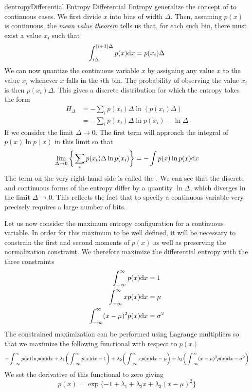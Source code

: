 \documentclass[9pt]{article}
\begin{document}
\begin{topic}{dentropy}{Differential Entropy}
Differential Entropy generalize the concept of  to continuous cases. We first divide $x$ into bins of width $\Delta$. Then, assuming $p(x)$ is continuous, the \textit{mean value theorem} tells us that, for each such bin, there must exist a value $x_i$ such that
\[
\int_{i\Delta}^{(i+1)\Delta} p(x)\mathrm{d} x = p(x_i)\Delta
\]
We can now quantize the continuous variable $x$ by assigning any value $x$ to the value $x_i$ whenever $x$ falls in the $i$th bin. The probability of observing the value $x_i$ is then $p(x_i)\Delta$. This gives a discrete distribution for which the entropy takes the form
\[
\begin{split}
H_{\Delta} & = -\sum_i p(x_i) \Delta \ln(p(x_i)\Delta)\\
& = -\sum_i p(x_i)\Delta \ln p(x_i) - \ln\Delta
\end{split}
\]
If we consider the limit $\Delta \to 0$. The first term will approach the integral of $p(x)\ln p(x)$ in this limit so that 
\[
\lim_{\Delta \to 0}\bigg\{\sum_i p(x_i) \Delta \ln p(x_i) \bigg\} = -\int p(x) \ln p(x) \mathrm{d} x
\]
The term on the very right-hand side is called the \textit{\color{red}{differential entropy}}. We can see that the discrete and continuous forms of the entropy differ by a quantity $\ln \Delta$, which diverges in the limit $\Delta \to 0$. This reflects the fact that to specify a continuous variable very precisely requires a large number of bits.

Let us now consider the maximum entropy configuration for a continuous variable. In order for this maximum to be well defined, it will be necessary to constrain the first and second moments of $p(x)$ as well as preserving the normalization constraint. We therefore maximize the differential entropy with the three constraints
\[
\begin{split}
\int_{-\infty}^{\infty} p(x)\mathrm{d} x & = 1\\
\int_{-\infty}^{\infty} xp(x)\mathrm{d} x & = \mu\\
\int_{-\infty}^{\infty} (x-\mu)^2 p(x)\mathrm{d} x & = \sigma^2\\
\end{split}
\]
The constrained maximization can be performed using Lagrange multipliers so that we maximize the following functional with respect to $p(x)$
\[
-\int_{-\infty}^{\infty} p(x) \ln p(x) \mathrm{d} x + \lambda_1\bigg(\int_{-\infty}^{\infty} p(x)\mathrm{d} x - 1\bigg) + \lambda_2\bigg(\int_{-\infty}^{\infty} xp(x)\mathrm{d} x - \mu\bigg) + \lambda_3\bigg(\int_{-\infty}^{\infty} (x-\mu)^2 p(x)\mathrm{d} x -\sigma^2\bigg)
\]
We set the derivative of this functional to zero giving
\[
p(x) = \exp\{-1+\lambda_1+\lambda_2x+\lambda_3(x-\mu)^2\}
\]


\end{topic}
\end{document}
